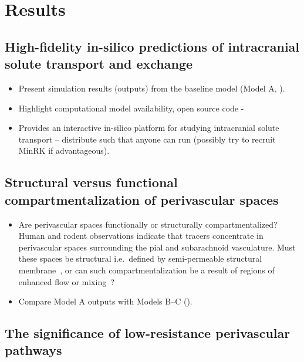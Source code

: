 \documentclass[fleqn,10pt]{wlscirep}
\newcommand{\draft}[1]{\textcolor{gray}{#1}}
\begin{document}
\section*{Results}

\subsection*{High-fidelity in-silico predictions of intracranial solute transport and exchange}

\begin{itemize}
\item
  Present simulation results (outputs) from the baseline model (Model A, ). 
\item
  Highlight computational model availability, open source code -
\item
  Provides an interactive in-silico platform for studying intracranial solute transport -- distribute such that anyone can run (possibly try to recruit MinRK if advantageous).
\end{itemize}

\draft{\lipsum[1]}


\subsection*{Structural versus functional compartmentalization of perivascular spaces}

\begin{itemize}
\item
  Are perivascular spaces functionally or structurally
  compartmentalized? Human and rodent observations indicate that
  tracers concentrate in perivascular spaces surrounding the pial and
  subarachnoid vasculature. Must these spaces be structural
  i.e.~defined by semi-permeable structural membrane~\cite{zhang1990interrelationships, zhang1992directional, mestre2018flow, eide2024functional}, or can such
  compartmentalization be a result of regions of enhanced flow or
  mixing~\cite{bedussi2017paravascular, vinje2021brain}?
\item
  Compare Model A outputs with Models B--C ().
\end{itemize}

\draft{\lipsum[1]}

\subsection*{The significance of low-resistance perivascular pathways}
\end{document}
